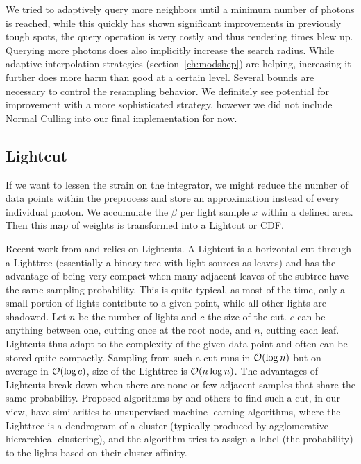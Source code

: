 We tried to adaptively query more neighbors until a minimum number of photons is reached, while this quickly has shown significant improvements in previously tough spots, the query operation is very costly and thus rendering times blew up. Querying more photons does also implicitly increase the search radius. While adaptive interpolation strategies (section~\ref{ch:modshep}) are helping, increasing it further does more harm than good at a certain level. Several bounds are necessary to control the resampling behavior. We definitely see potential for improvement with a more sophisticated strategy, however we did not include Normal Culling into our final implementation for now.

\subsection{Lightcut}

If we want to lessen the strain on the integrator, we might reduce the number of data points within the preprocess and store an approximation instead of every individual photon. We accumulate the $\beta$ per light sample $x$ within a defined area. Then this map of weights is transformed into a Lightcut or CDF.

Recent work from \textcite{Estevez} and \textcite{Vevoda} relies on Lightcuts. A Lightcut is a horizontal cut through a Lighttree (essentially a binary tree with light sources as leaves) and has the advantage of being very compact when many adjacent leaves of the subtree have the same sampling probability. This is quite typical, as most of the time, only a small portion of lights contribute to a given point, while all other lights are shadowed. Let $n$ be the number of lights and $c$ the size of the cut. $c$ can be anything between one, cutting once at the root node, and $n$, cutting each leaf. Lightcuts thus adapt to the complexity of the given data point and often can be stored quite compactly. Sampling from such a cut runs in $\mathcal{O}(\log{n})$ but on average in $\mathcal{O}(\log{c})$, size of the Lighttree is $\mathcal{O}(n\log{n})$. The advantages of Lightcuts break down when there are none or few adjacent samples that share the same probability. Proposed algorithms by \textcite{Estevez} and others to find such a cut, in our view, have similarities to unsupervised machine learning algorithms, where the Lighttree is a dendrogram of a cluster (typically produced by agglomerative hierarchical clustering), and the algorithm tries to assign a label (the probability) to the lights based on their cluster affinity. 

